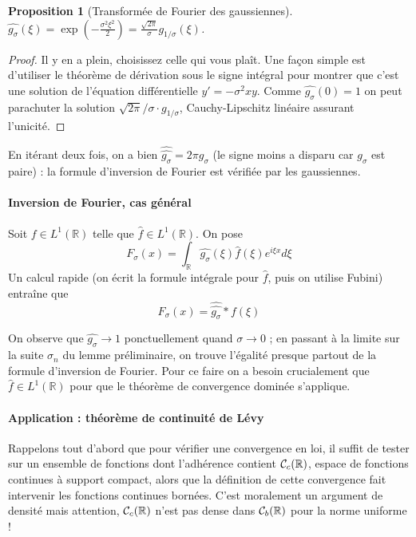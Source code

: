 \documentclass[a4paper, 11pt]{article}
\def\R{\mathbb{R}}
\def\Cf{{\cal{C}}}
\newtheorem*{proposition}{Proposition}
\begin{document}
\begin{proposition}[Transformée de Fourier des gaussiennes]
  $\displaystyle \widehat{g_\sigma}(\xi) =
  \exp\left(- \frac{\sigma^2 \xi^2}{2} \right) =
  \frac{\sqrt{2\pi}}{\sigma} g_{1/\sigma}(\xi)$.
\end{proposition}
\begin{proof}
  Il y en a plein, choisissez celle qui vous plaît. Une façon simple est
  d'utiliser le théorème de dérivation sous le signe intégral pour montrer que
  c'est une solution de l'équation différentielle $y' = -\sigma^2xy $. Comme
  $\widehat{g_\sigma}(0) = 1$ on peut parachuter la solution $\sqrt{2\pi}/\sigma
  \cdot g_{1/\sigma}$, Cauchy-Lipschitz linéaire assurant l'unicité.
\end{proof}

En itérant deux fois, on a bien $\widehat{\widehat{g_{\sigma}}} = 2\pi g_\sigma$
(le signe moins a disparu car $g_\sigma$ est paire) : la formule d'inversion de
Fourier est vérifiée par les gaussiennes.

\paragraph{Inversion de Fourier, cas général}

Soit $f \in L^1(\R)$ telle que $\hat{f} \in L^1(\R)$. On pose
\[ F_\sigma(x) = \int_\R \widehat{g_\sigma}(\xi)\hat{f}(\xi)e^{i\xi x} d\xi \]
Un calcul rapide (on écrit la formule intégrale pour $\hat{f}$, puis on utilise
Fubini) entraîne que
\[ F_\sigma(x) = \widehat{\widehat{g_\sigma}} * f(\xi) \]

On observe que $\widehat{g_\sigma} \longrightarrow 1$ ponctuellement quand
$\sigma \to 0$ ; en passant à la limite sur la suite $\sigma_n$ du lemme
préliminaire, on trouve l'égalité presque partout de la formule d'inversion de
Fourier. Pour ce faire on a besoin crucialement que $\hat{f} \in L^1(\R)$ pour
que le théorème de convergence dominée s'applique.

\paragraph{Application : théorème de continuité de Lévy} Rappelons tout d'abord
que pour vérifier une convergence en loi, il suffit de tester sur un ensemble de
fonctions dont l'adhérence contient $\Cf_c(\R)$, espace de fonctions continues
à support compact, alors que la définition de cette convergence fait intervenir
les fonctions continues bornées. C'est moralement un argument de densité mais
attention, $\Cf_c(\R)$ n'est pas dense dans $\Cf_b(\R)$ pour la norme uniforme !
\end{document}
